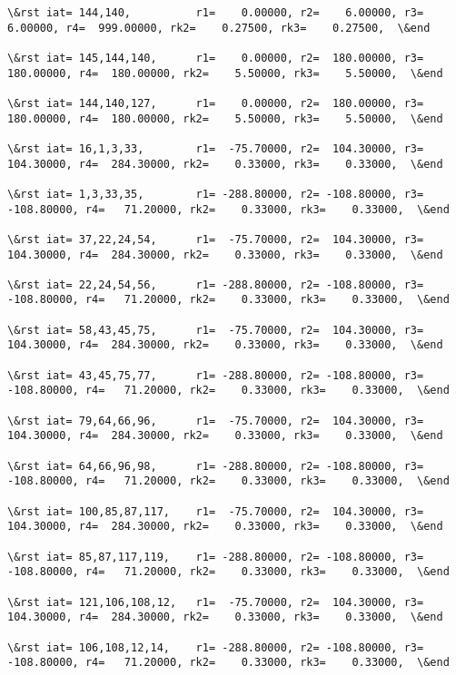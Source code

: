 \documentclass[11pt]{article}
\begin{document}
\begin{Verbatim}[commandchars=\\\{\}]
\&rst iat= 144,140,          r1=    0.00000, r2=    6.00000, r3=    6.00000, r4=  999.00000, rk2=    0.27500, rk3=    0.27500,  \&end

\&rst iat= 145,144,140,      r1=    0.00000, r2=  180.00000, r3=  180.00000, r4=  180.00000, rk2=    5.50000, rk3=    5.50000,  \&end

\&rst iat= 144,140,127,      r1=    0.00000, r2=  180.00000, r3=  180.00000, r4=  180.00000, rk2=    5.50000, rk3=    5.50000,  \&end

\&rst iat= 16,1,3,33,        r1=  -75.70000, r2=  104.30000, r3=  104.30000, r4=  284.30000, rk2=    0.33000, rk3=    0.33000,  \&end

\&rst iat= 1,3,33,35,        r1= -288.80000, r2= -108.80000, r3= -108.80000, r4=   71.20000, rk2=    0.33000, rk3=    0.33000,  \&end

\&rst iat= 37,22,24,54,      r1=  -75.70000, r2=  104.30000, r3=  104.30000, r4=  284.30000, rk2=    0.33000, rk3=    0.33000,  \&end

\&rst iat= 22,24,54,56,      r1= -288.80000, r2= -108.80000, r3= -108.80000, r4=   71.20000, rk2=    0.33000, rk3=    0.33000,  \&end

\&rst iat= 58,43,45,75,      r1=  -75.70000, r2=  104.30000, r3=  104.30000, r4=  284.30000, rk2=    0.33000, rk3=    0.33000,  \&end

\&rst iat= 43,45,75,77,      r1= -288.80000, r2= -108.80000, r3= -108.80000, r4=   71.20000, rk2=    0.33000, rk3=    0.33000,  \&end

\&rst iat= 79,64,66,96,      r1=  -75.70000, r2=  104.30000, r3=  104.30000, r4=  284.30000, rk2=    0.33000, rk3=    0.33000,  \&end

\&rst iat= 64,66,96,98,      r1= -288.80000, r2= -108.80000, r3= -108.80000, r4=   71.20000, rk2=    0.33000, rk3=    0.33000,  \&end

\&rst iat= 100,85,87,117,    r1=  -75.70000, r2=  104.30000, r3=  104.30000, r4=  284.30000, rk2=    0.33000, rk3=    0.33000,  \&end

\&rst iat= 85,87,117,119,    r1= -288.80000, r2= -108.80000, r3= -108.80000, r4=   71.20000, rk2=    0.33000, rk3=    0.33000,  \&end

\&rst iat= 121,106,108,12,   r1=  -75.70000, r2=  104.30000, r3=  104.30000, r4=  284.30000, rk2=    0.33000, rk3=    0.33000,  \&end

\&rst iat= 106,108,12,14,    r1= -288.80000, r2= -108.80000, r3= -108.80000, r4=   71.20000, rk2=    0.33000, rk3=    0.33000,  \&end


\end{Verbatim}
\end{document}
